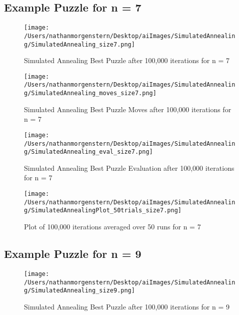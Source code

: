 \documentclass{report}
\begin{document}
\subsection{Example Puzzle for n = 7}

	\begin{figure}[H]
	\centering
	\texttt{[image: /Users/nathanmorgenstern/Desktop/aiImages/SimulatedAnnealing/SimulatedAnnealing\_size7.png]}
	\caption{Simulated Annealing Best Puzzle after 100,000 iterations for n = 7} 
	\label{fig: Simulated Annealing Best Puzzle after 100,000 iterations for n = 7}
	\end{figure}
	
	\begin{figure}[H]
	\centering
	\texttt{[image: /Users/nathanmorgenstern/Desktop/aiImages/SimulatedAnnealing/SimulatedAnnealing\_moves\_size7.png]}
	\caption{Simulated Annealing Best Puzzle Moves after 100,000 iterations for n = 7} 
	\label{fig: Simulated Annealing Best Puzzle Moves after 100,000 iterations for n = 7}
	\end{figure}

	\begin{figure}[H]
	\centering
	\texttt{[image: /Users/nathanmorgenstern/Desktop/aiImages/SimulatedAnnealing/SimulatedAnnealing\_eval\_size7.png]}
	\caption{Simulated Annealing Best Puzzle Evaluation after 100,000 iterations for n = 7} 
	\label{fig: Simulated Annealing Best Puzzle Evaluation after 100,000 iterations for n = 7} 
	\end{figure}

	\begin{figure}[H]
	\centering
	\texttt{[image: /Users/nathanmorgenstern/Desktop/aiImages/SimulatedAnnealing/SimulatedAnnealingPlot\_50trials\_size7.png]}
	\caption{Plot of 100,000 iterations averaged over 50 runs for n = 7}
	\label{fig: Plot of 100,000 iterations averaged over 50 runs for n = 7}
	\end{figure}


\subsection{Example Puzzle for n = 9}
	
	\begin{figure}[H]
	\centering
	\texttt{[image: /Users/nathanmorgenstern/Desktop/aiImages/SimulatedAnnealing/SimulatedAnnealing\_size9.png]}
	\caption{Simulated Annealing Best Puzzle after 100,000 iterations for n = 9} 
	\label{fig: Simulated Annealing Best Puzzle after 100,000 iterations for n = 9}
	\end{figure}
	
\end{document}
